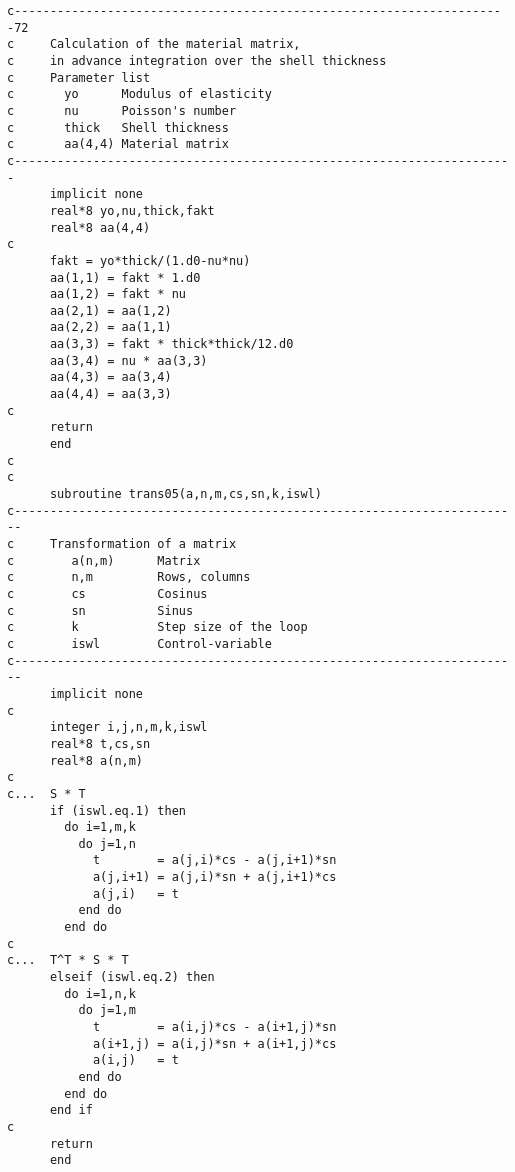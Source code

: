 {\begin{verbatim}
c---------------------------------------------------------------------72
c     Calculation of the material matrix, 
c     in advance integration over the shell thickness
c     Parameter list
c       yo      Modulus of elasticity
c       nu      Poisson's number 
c       thick   Shell thickness
c       aa(4,4) Material matrix
c----------------------------------------------------------------------
      implicit none
      real*8 yo,nu,thick,fakt
      real*8 aa(4,4)
c
      fakt = yo*thick/(1.d0-nu*nu)
      aa(1,1) = fakt * 1.d0
      aa(1,2) = fakt * nu
      aa(2,1) = aa(1,2)
      aa(2,2) = aa(1,1)
      aa(3,3) = fakt * thick*thick/12.d0 
      aa(3,4) = nu * aa(3,3)
      aa(4,3) = aa(3,4) 
      aa(4,4) = aa(3,3)
c
      return
      end
c
c
      subroutine trans05(a,n,m,cs,sn,k,iswl)
c-----------------------------------------------------------------------
c     Transformation of a matrix
c        a(n,m)      Matrix        
c        n,m         Rows, columns
c        cs          Cosinus
c        sn          Sinus
c        k           Step size of the loop
c        iswl        Control-variable
c-----------------------------------------------------------------------
      implicit none
c
      integer i,j,n,m,k,iswl
      real*8 t,cs,sn
      real*8 a(n,m)
c    
c...  S * T
      if (iswl.eq.1) then
        do i=1,m,k
          do j=1,n
            t        = a(j,i)*cs - a(j,i+1)*sn
            a(j,i+1) = a(j,i)*sn + a(j,i+1)*cs
            a(j,i)   = t
          end do
        end do
c
c...  T^T * S * T
      elseif (iswl.eq.2) then
        do i=1,n,k
          do j=1,m
            t        = a(i,j)*cs - a(i+1,j)*sn
            a(i+1,j) = a(i,j)*sn + a(i+1,j)*cs
            a(i,j)   = t
          end do
        end do
      end if
c
      return
      end
\end{verbatim}
}

 
